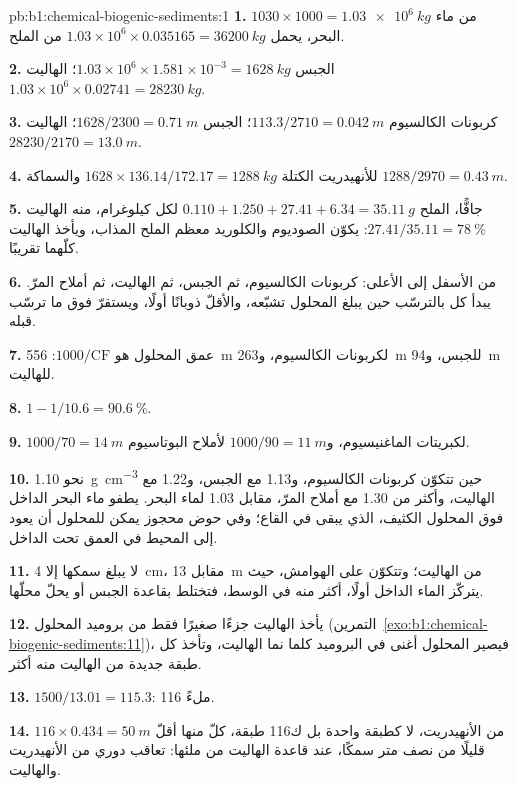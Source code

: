 \begin{solution}{pb:b1:chemical-biogenic-sediments:1}
\textbf{1.} $1030\times1000 = \qty{1.03e6}{kg}$ من ماء البحر، يحمل
$1.03\times10^6\times0.035165 = \qty{36200}{kg}$ من الملح.

\textbf{2.} الجبس $1.03\times10^6\times1.581\times10^{-3} = \qty{1628}{kg}$؛ الهاليت $1.03\times10^6\times0.02741 = \qty{28230}{kg}$.

\textbf{3.} كربونات الكالسيوم $113.3/2710 = \qty{0.042}{m}$؛ الجبس $1628/2300 =
\qty{0.71}{m}$؛ الهاليت $28230/2170 = \qty{13.0}{m}$.

\textbf{4.} للأنهيدريت الكتلة $1628\times136.14/172.17 =
\qty{1288}{kg}$ والسماكة $1288/2970 = \qty{0.43}{m}$.

\textbf{5.} جافًّا، الملح $0.110 + 1.250 + 27.41 + 6.34 = \qty{35.11}{g}$ لكل كيلوغرام، منه الهاليت $27.41/35.11 = \qty{78}{\%}$: يكوّن الصوديوم والكلوريد معظم الملح المذاب، ويأخذ الهاليت كلّهما تقريبًا.

\textbf{6.} من الأسفل إلى الأعلى: كربونات الكالسيوم، ثم الجبس، ثم الهاليت، ثم أملاح المرّ. يبدأ كل  بالترسّب حين يبلغ المحلول تشبّعه، والأقلّ ذوبانًا أولًا، ويستقرّ فوق ما ترسّب قبله.

\textbf{7.} عمق المحلول هو $1000/\mathrm{CF}$: \qty{556}{m} لكربونات الكالسيوم، و\qty{263}{m} للجبس، و\qty{94}{m} للهاليت.

\textbf{8.} $1 - 1/10.6 = \qty{90.6}{\%}$.

\textbf{9.} $1000/70 = \qty{14}{m}$ لكبريتات الماغنيسيوم، و$1000/90 = \qty{11}{m}$ لأملاح البوتاسيوم.

\textbf{10.} نحو \qty{1.10}{g.cm^{-3}} حين تتكوّن كربونات الكالسيوم، و\num{1.13} مع الجبس، و\num{1.22} مع الهاليت، وأكثر من \num{1.30} مع أملاح المرّ، مقابل \num{1.03} لماء البحر. يطفو ماء البحر الداخل فوق المحلول الكثيف، الذي يبقى في القاع؛ وفي حوض محجوز يمكن للمحلول أن يعود إلى المحيط في العمق تحت الداخل.

\textbf{11.} لا يبلغ سمكها إلا \qty{4}{cm}، مقابل \qty{13}{m} من الهاليت؛ وتتكوّن على الهوامش، حيث يتركّز الماء الداخل أولًا، أكثر منه في الوسط، فتختلط بقاعدة الجبس أو يحلّ محلّها.

\textbf{12.} يأخذ الهاليت جزءًا صغيرًا فقط من بروميد المحلول (التمرين~\ref{exo:b1:chemical-biogenic-sediments:11})، فيصير المحلول أغنى في البروميد كلما نما الهاليت، وتأخذ كل طبقة جديدة من الهاليت منه أكثر.

\textbf{13.} $1500/13.01 = 115.3$: 116 ملءً.

\textbf{14.} $116\times0.434 = \qty{50}{m}$ من الأنهيدريت، لا كطبقة واحدة بل ك\num{116} طبقة، كلّ منها أقلّ قليلًا من نصف متر سمكًا، عند قاعدة الهاليت من ملئها: تعاقب دوري من الأنهيدريت والهاليت.


\end{solution}
